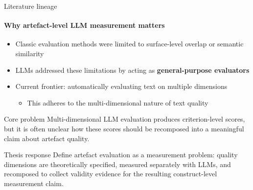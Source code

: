 \begin{frame}{Literature lineage}
\framesubtitle{Why artefact-level LLM measurement matters}

\begin{itemize}
    \item Classic evaluation methods were limited to surface-level overlap \citep{papineni2001bleu,lin2004rouge} or semantic similarity \citep{zhang2019bertscore, zhao2019moverscore}
    \item LLMs addressed these limitations by acting as \textbf{general-purpose evaluators} \citep{liu_g-eval_2023, zheng_judging_2023}
    \item Current frontier: automatically evaluating text on multiple dimensions \citep{hashemi_llm-rubric_2024,kolaSAJASimpleApproach2026,bang_transforming_2025}
    \begin{itemize}
        \item This adheres to the multi-dimensional nature of text quality \citep{fabbri_summeval_2021}
    \end{itemize}
\end{itemize}

\vspace{0.1cm}

\begin{block}{Core problem}
    Multi-dimensional LLM evaluation produces criterion-level scores, but it is often unclear how these scores should be recomposed into a meaningful claim about artefact quality.
\end{block}


\begin{exampleblock}{Thesis response}
    Define artefact evaluation as a measurement problem: quality dimensions are theoretically specified, measured separately with LLMs, and recomposed to collect validity evidence for the resulting construct-level measurement claim.
\end{exampleblock}

\end{frame}